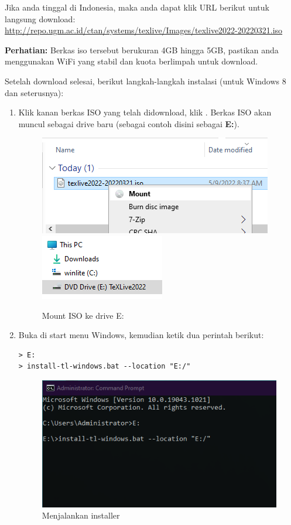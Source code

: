 \documentclass{book} %
\begin{document}
	Jika anda tinggal di Indonesia, maka anda dapat klik URL berikut untuk langsung download:\\
	\url{http://repo.ugm.ac.id/ctan/systems/texlive/Images/texlive2022-20220321.iso}

	\bigskip

	\textbf{Perhatian:} Berkas iso tersebut berukuran 4GB hingga 5GB, pastikan anda menggunakan WiFi yang stabil dan kuota berlimpah untuk download.

	\newpage

	Setelah download selesai, berikut langkah-langkah instalasi (untuk Windows 8 dan seterusnya):

	\begin{enumerate}
		\item Klik kanan berkas ISO yang telah didownload, klik .
		Berkas ISO akan muncul sebagai drive baru (sebagai contoh disini sebagai \textbf{E:}).
		\begin{figure}[!ht]
			\centering
			\includegraphics[width=0.3\linewidth]{images/texlivewin0}
			\includegraphics[width=0.3\linewidth]{images/texlivewin1}
			\caption{Mount ISO ke drive E:}
		\end{figure}

		\item Buka  di start menu Windows, kemudian ketik dua perintah berikut:
		\begin{verbatim}
> E:
> install-tl-windows.bat --location "E:/"
		\end{verbatim}

		\begin{figure}[!ht]
			\centering
			\includegraphics[width=0.4\linewidth]{images/texlivewin2}
			\caption{Menjalankan installer}
		\end{figure}


\end{enumerate}
\end{document}
